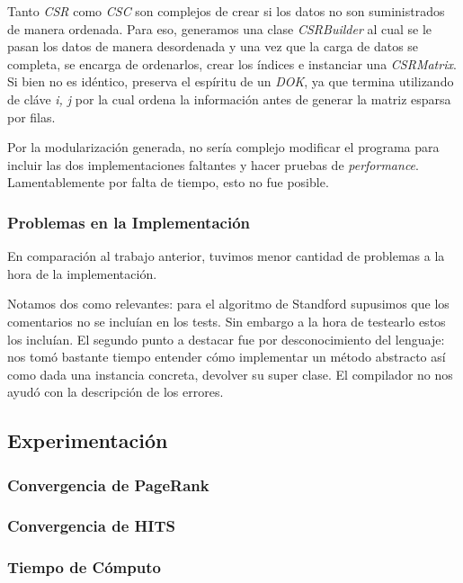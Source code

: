 	Tanto \textit{CSR} como \textit{CSC} son complejos de crear si los datos no son suministrados de manera ordenada. Para eso, generamos una clase \textit{CSRBuilder} al cual se le pasan los datos de manera desordenada y una vez que la carga de datos se completa, se encarga de ordenarlos, crear los índices e instanciar una \textit{CSRMatrix}. Si bien no es idéntico, preserva el espíritu de un \textit{DOK}, ya que termina utilizando de cláve \textit{i, j} por la cual ordena la información antes de generar la matriz esparsa por filas. 

	Por la modularización generada, no sería complejo modificar el programa para incluir las dos implementaciones faltantes y hacer pruebas de \textit{performance}. Lamentablemente por falta de tiempo, esto no fue posible.

\subsubsection{Problemas en la Implementación}

	En comparación al trabajo anterior, tuvimos menor cantidad de problemas a la hora de la implementación. 

	Notamos dos como relevantes: para el algoritmo de Standford supusimos que los comentarios no se incluían en los tests. Sin embargo a la hora de testearlo estos los incluían. El segundo punto a destacar fue por desconocimiento del lenguaje: nos tomó bastante tiempo entender cómo implementar un método abstracto así como dada una instancia concreta, devolver su super clase. El compilador no nos ayudó con la descripción de los errores.

\subsection{Experimentación}
\subsubsection{Convergencia de PageRank}

\subsubsection{Convergencia de HITS}

\subsubsection{Tiempo de Cómputo}	

